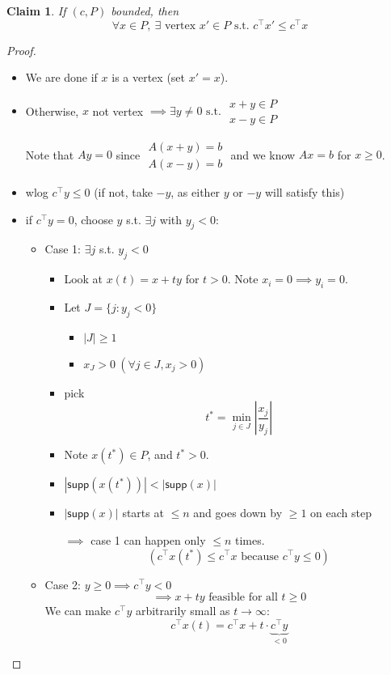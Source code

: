\documentclass[11pt]{article}
\newtheorem{claim}[theorem]{Claim}
\begin{document}
\begin{claim}
  If $(c,P)$ bounded, then
  \[\forall x \in P,~
    \exists \text{ vertex } x' \in P \text{ s.t. } c^\top x' \leq c^\top x\]
\end{claim}
\begin{proof}
  
  \begin{itemize}
  \item We are done if $x$ is a vertex (set $x' = x$).
    
  \item Otherwise, $x$ not vertex
    $\implies \exists y \neq 0 \text{ s.t. }
    \begin{aligned}x+y \in P \\ x-y \in P\end{aligned}$

    Note that $Ay = 0$ since
    $\begin{aligned}
      A(x+y) = b \\ A(x-y) = b
    \end{aligned}$ and we know
    $Ax = b$ for $x \geq 0$.
  \item wlog $c^\top y \leq 0$
    (if not, take $-y$, as either $y$ or $-y$ will satisfy this)
  \item if $c^\top y = 0$, choose $y$ s.t. $\exists j$ with $y_j < 0$:
    \begin{itemize}

    \item Case 1: $\exists j$ s.t. $y_j < 0$
      \begin{itemize}
      \item  Look at $x(t) = x + ty$ for $t>0$.
        Note $x_i = 0 \implies y_i = 0$.

      \item Let $J = \{j : y_j < 0\}$
        \begin{itemize}
        \item $|J| \geq 1$
        \item $x_J > 0~(\forall j \in J, x_j > 0)$
        \end{itemize}
        \item pick \[t^* = \min_{j\in J} \left| \frac{x_j}{y_j} \right|\]
        \item Note $x(t^*) \in P$, and $t^* > 0$.
      \item $|\textsf{supp}(x(t^*))| < |\textsf{supp}(x)|$

      \item $|\textsf{supp}(x)|$ starts at $\leq n$ and goes down by $\geq 1$ on each step

        $\implies$ case 1
        can happen only $\leq n$ times.
        \[(c^\top x(t^*) \leq c^\top x \text{ because } c^\top y \leq 0)\]
      \end{itemize}
    \item Case 2: $y \geq 0 \implies c^\top y < 0$
      \[\implies x + ty \text{ feasible for all } t \geq 0\]
      We can make $c^\top y$ arbitrarily small as $t \to \infty$:
      \[c^\top x(t) = c^\top x + t\cdot \underbrace{c^\top y}_{<0}\]
    \end{itemize}
  \end{itemize}
\end{proof}
\end{document}

